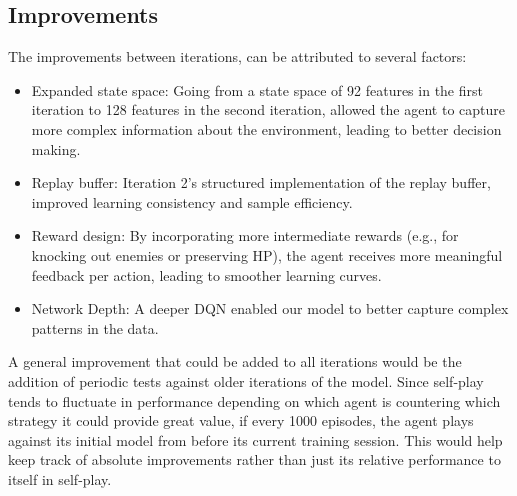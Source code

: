 \subsection{Improvements}
The improvements between iterations, can be attributed to several factors:
\begin{itemize}
    \item Expanded state space: Going from a state space of 92 features in the first iteration
          to 128 features in the second iteration, allowed the agent to capture more complex information
          about the environment, leading to better decision making.
    \item Replay buffer: Iteration 2's structured implementation of the replay buffer, improved
          learning consistency and sample efficiency.
    \item Reward design: By incorporating more intermediate rewards (e.g., for knocking out enemies or preserving HP),
          the agent receives more meaningful feedback per action, leading to smoother learning curves.
    \item Network Depth: A deeper DQN enabled our model to better capture complex patterns in the data.
\end{itemize}

A general improvement that could be added to all iterations would be the addition of periodic tests against older iterations of the model.
Since self-play tends to fluctuate in performance depending on which agent is countering which strategy it could provide great value, if 
every 1000 episodes, the agent plays against its initial model from before its current training session. This would help keep track of 
absolute improvements rather than just its relative performance to itself in self-play.

